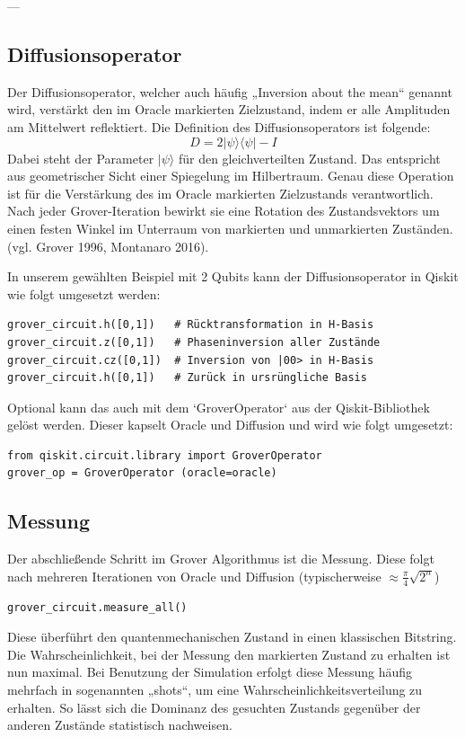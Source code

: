 ---

\subsection*{Diffusionsoperator}
Der Diffusionsoperator, welcher auch häufig „Inversion about the mean“ genannt wird, verstärkt den im Oracle markierten Zielzustand, indem er alle Amplituden am Mittelwert reflektiert. Die Definition des Diffusionsoperators ist folgende:
$$
D = 2|\psi\rangle\langle\psi| - I
$$
Dabei steht der Parameter $|\psi\rangle$ für den gleichverteilten Zustand. Das entspricht aus geometrischer Sicht einer Spiegelung im Hilbertraum. Genau diese Operation ist für die Verstärkung des im Oracle markierten Zielzustands verantwortlich. Nach jeder Grover-Iteration bewirkt sie eine Rotation des Zustandsvektors um einen festen Winkel im Unterraum von markierten und unmarkierten Zuständen. (vgl. Grover 1996, Montanaro 2016).

In unserem gewählten Beispiel mit 2 Qubits kann der Diffusionsoperator in Qiskit wie folgt umgesetzt werden:
\begin{verbatim}
grover_circuit.h([0,1])   # Rücktransformation in H-Basis
grover_circuit.z([0,1])   # Phaseninversion aller Zustände
grover_circuit.cz([0,1])  # Inversion von |00> in H-Basis
grover_circuit.h([0,1])   # Zurück in ursrüngliche Basis
\end{verbatim}

Optional kann das auch mit dem `GroverOperator` aus der Qiskit-Bibliothek gelöst werden. Dieser kapselt Oracle und Diffusion und wird wie folgt umgesetzt:
\begin{verbatim}
from qiskit.circuit.library import GroverOperator
grover_op = GroverOperator (oracle=oracle)
\end{verbatim}

\subsection*{Messung}
Der abschließende Schritt im Grover Algorithmus ist die Messung. Diese folgt nach mehreren Iterationen von Oracle und Diffusion (typischerweise $\approx \frac{\pi}{4} \sqrt{2^n}$)
\begin{verbatim}
grover_circuit.measure_all()
\end{verbatim}
Diese überführt den quantenmechanischen Zustand in einen klassischen Bitstring. 
Die Wahrscheinlichkeit, bei der Messung den markierten Zustand zu erhalten ist nun maximal. Bei Benutzung der Simulation erfolgt diese Messung häufig mehrfach in sogenannten „shots“, um eine Wahrscheinlichkeitsverteilung zu erhalten. So lässt sich die Dominanz des gesuchten Zustands gegenüber der anderen Zustände statistisch nachweisen.


